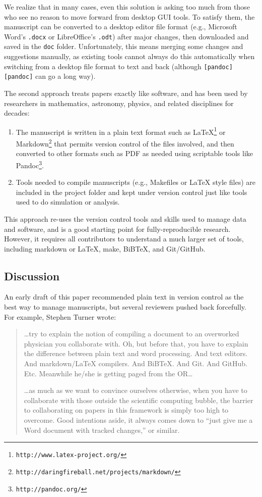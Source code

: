 \documentclass[10pt]{article}
\newcommand{\withurl}[2]{{#1}\footnote{\texttt{#2}}}
\begin{document}
We realize that in many cases, even this solution is asking too much
from those who see no reason to move forward from desktop GUI tools. To
satisfy them, the manuscript can be converted to a desktop editor file
format (e.g., Microsoft Word's \texttt{.docx} or LibreOffice's
\texttt{.odt}) after major changes, then downloaded and saved in the
\texttt{doc} folder. Unfortunately, this means merging some changes and
suggestions manually, as existing tools cannot always do this
automatically when switching from a desktop file format to text and back
(although \texttt{{[}pandoc{]}{[}pandoc{]}} can go a long way).

The second approach treats papers exactly like software, and has been
used by researchers in mathematics, astronomy, physics, and related
disciplines for decades:

\begin{enumerate}
\item
  The manuscript is written in a plain text format such as
  \withurl{LaTeX}{http://www.latex-project.org/} or
  \withurl{Markdown}{http://daringfireball.net/projects/markdown/} that
  permits version control of the files involved, and then converted to
  other formats such as PDF as needed using scriptable tools like
  \withurl{Pandoc}{http://pandoc.org/}.
\item
  Tools needed to compile manuscripts (e.g., Makefiles or LaTeX style
  files) are included in the project folder and kept under version
  control just like tools used to do simulation or analysis.
\end{enumerate}

This approach re-uses the version control tools and skills used to
manage data and software, and is a good starting point for
fully-reproducible research. However, it requires all contributors to
understand a much larger set of tools, including markdown or LaTeX,
make, BiBTeX, and Git/GitHub.

\subsection*{Discussion}

An early draft of this paper recommended plain text in version control
as the best way to manage manuscripts, but several reviewers pushed back
forcefully. For example, Stephen Turner wrote:

\begin{quote}
{\ldots}try to explain the notion of compiling a document to an
overworked physician you collaborate with. Oh, but before that, you have
to explain the difference between plain text and word processing. And
text editors. And markdown/LaTeX compilers. And BiBTeX. And Git. And
GitHub. Etc. Meanwhile he/she is getting paged from the OR{\ldots}

{\ldots}as much as we want to convince ourselves otherwise, when you
have to collaborate with those outside the scientific computing bubble,
the barrier to collaborating on papers in this framework is simply too
high to overcome. Good intentions aside, it always comes down to ``just
give me a Word document with tracked changes,'' or similar.
\end{quote}
\end{document}
